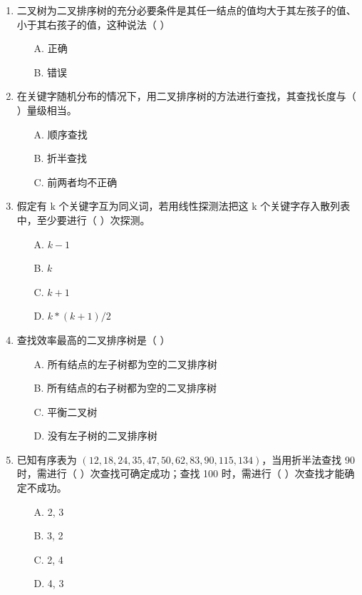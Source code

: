 \documentclass[12pt, a4paper]{article}
\begin{document}
\begin{enumerate}[label=\arabic*.]
	\item 二叉树为二叉排序树的充分必要条件是其任一结点的值均大于其左孩子的值、小于其右孩子的值，这种说法（ ）
	      \begin{enumerate}
		      \item[A.] 正确
		      \item[B.] 错误
	      \end{enumerate}

	\item 在关键字随机分布的情况下，用二叉排序树的方法进行查找，其查找长度与（ ）量级相当。
	      \begin{enumerate}
		      \item[A.] 顺序查找
		      \item[B.] 折半查找
		      \item[C.] 前两者均不正确
	      \end{enumerate}

	\item 假定有 k 个关键字互为同义词，若用线性探测法把这 k 个关键字存入散列表中，至少要进行（ ）次探测。
	      \begin{enumerate}
		      \item[A.] $k-1$
		      \item[B.] $k$
		      \item[C.] $k+1$
		      \item[D.] $k*(k+1)/2$
	      \end{enumerate}

	\item 查找效率最高的二叉排序树是（ ）
	      \begin{enumerate}
		      \item[A.] 所有结点的左子树都为空的二叉排序树
		      \item[B.] 所有结点的右子树都为空的二叉排序树
		      \item[C.] 平衡二叉树
		      \item[D.] 没有左子树的二叉排序树
	      \end{enumerate}

	\item 已知有序表为 $(12, 18, 24, 35, 47, 50, 62, 83, 90, 115, 134)$，当用折半法查找 90 时，需进行（ ）次查找可确定成功；查找 100 时，需进行（ ）次查找才能确定不成功。
	      \begin{enumerate}
		      \item[A.] 2, 3
		      \item[B.] 3, 2
		      \item[C.] 2, 4
		      \item[D.] 4, 3
	      \end{enumerate}


\end{enumerate}
\end{document}

